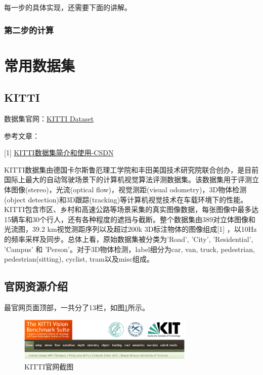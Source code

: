每一步的具体实现，还需要下面的讲解。

\subsubsection{第二步的计算}








\section{常用数据集}

\subsection{KITTI}

数据集官网：\href{http://www.cvlibs.net/datasets/kitti/index.php}{KITTI Dataset}

参考文章：

[1] \href{https://blog.csdn.net/Solomon1558/article/details/70173223}{KITTI数据集简介和使用-CSDN}

KITTI数据集由德国卡尔斯鲁厄理工学院和丰田美国技术研究院联合创办，是目前国际上最大的自动驾驶场景下的计算机视觉算法评测数据集。该数据集用于评测立体图像(stereo)，光流(optical flow)，视觉测距(visual odometry)，3D物体检测(object detection)和3D跟踪(tracking)等计算机视觉技术在车载环境下的性能。KITTI包含市区、乡村和高速公路等场景采集的真实图像数据，每张图像中最多达15辆车和30个行人，还有各种程度的遮挡与截断。整个数据集由389对立体图像和光流图，39.2 km视觉测距序列以及超过200k 3D标注物体的图像组成[1] ，以10Hz的频率采样及同步。总体上看，原始数据集被分类为’Road’, ’City’, ’Residential’, ’Campus’ 和 ’Person’。对于3D物体检测，label细分为car, van, truck, pedestrian, pedestrian(sitting), cyclist, tram以及misc组成。

\subsection{官网资源介绍}

最官网页面顶部，一共分了13栏，如图\ref{KITTI0}所示。

\begin{figure}[!hbtp]
\centering
\includegraphics[width=0.75\textwidth]{SemanticSLAM/KITTI0.png}
\caption{KITTI官网截图}
\label{KITTI0}
\end{figure}

